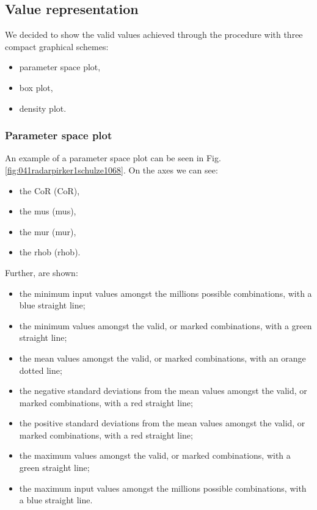 \subsection{Value representation}
\label{subsec:valuerepresentation}

We decided to show the valid values achieved through the procedure with three
compact graphical schemes:

\begin{itemize}
  \item{parameter space plot,}
  \item{box plot,}
  \item{density plot.}
\end{itemize}

\subsubsection{Parameter space plot}
\label{subsubsec:parameterspaceplot}

An example of a parameter space plot can be seen
in Fig. \ref{fig:041radarpirker1schulze1068}.
On the axes we can see:
\begin{itemize}
  \item{the \acl{CoR} (\acs{CoR}),}
  \item{the \acl{mus} (\acs{mus}),}
  \item{the \acl{mur} (\acs{mur}),}  
  \item{the \acl{rhob} (\acs{rhob}).}
\end{itemize}
Further, are shown:
\begin{itemize}
  \item{the minimum input values amongst the millions possible combinations,
  with a blue straight line;}
  \item{the minimum values amongst the valid, or marked combinations, with a
  green straight line;}
  \item{the mean values amongst the valid, or marked combinations, with an
  orange dotted line;}
  \item{the negative standard deviations from the mean values amongst the valid,
  or marked combinations, with a red straight line;}
  \item{the positive standard deviations from the mean values amongst the valid,
  or marked combinations, with a red straight line;}  
  \item{the maximum values amongst the valid, or marked combinations, with a
  green straight line;}
  \item{the maximum input values amongst the millions possible combinations,
  with a blue straight line.}  
\end{itemize}

